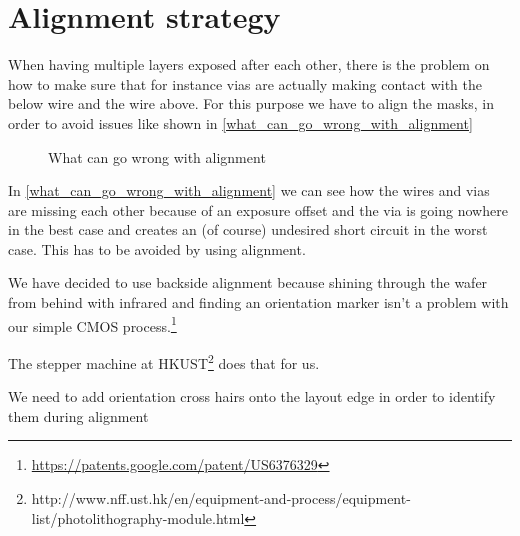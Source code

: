 \newcommand{\addAlignmentCross}[2]{
	\draw[line width=1.5mm, active,opacity=\OpacityLayout] (#1,#2+0.5) -- (#1+1,#2+0.5);
	\draw[line width=1.5mm, active,opacity=\OpacityLayout] (#1+0.5,#2) -- (#1+0.5,#2+1);
}

\section{Alignment strategy}
When having multiple layers exposed after each other, there is the problem on how to make sure that for instance vias are actually making contact with the below wire and the wire above.
For this purpose we have to align the masks, in order to avoid issues like shown in \autoref{what_can_go_wrong_with_alignment}

\begin{figure}[H]
	\centering
	\caption{What can go wrong with alignment}
	\label{what_can_go_wrong_with_alignment}
\end{figure}

In \autoref{what_can_go_wrong_with_alignment} we can see how the wires and vias are missing each other because of an exposure offset and the via is going nowhere in the best case and creates an (of course) undesired short circuit in the worst case. This has to be avoided by using alignment.

We have decided to use backside alignment because shining through the wafer from behind with infrared and finding an orientation marker isn't a problem with our simple CMOS process.\footnote{\url{https://patents.google.com/patent/US6376329}}

The stepper machine at HKUST\footnote{http://www.nff.ust.hk/en/equipment-and-process/equipment-list/photolithography-module.html} does that for us.

We need to add orientation cross hairs onto the layout edge in order to identify them during alignment

